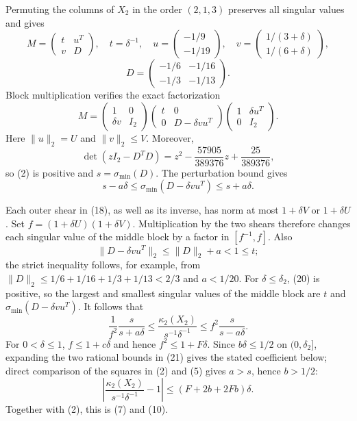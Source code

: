 \documentclass[11pt]{article}
\newcommand{\norm}[1]{\lVert#1\rVert_2}
\begin{document}
Permuting the columns of $X_2$ in the order $(2,1,3)$ preserves all singular
values and gives
\[
M=\begin{pmatrix}t&u^T\\v&D\end{pmatrix},\quad t=\delta^{-1},\quad
u=\begin{pmatrix}-1/9\\-1/19\end{pmatrix},\quad
v=\begin{pmatrix}1/(3+\delta)\\1/(6+\delta)\end{pmatrix},
\]
\[
D=\begin{pmatrix}-1/6&-1/16\\-1/3&-1/13\end{pmatrix}.
\tag{17}
\]
Block multiplication verifies the exact factorization
\[
M=
\begin{pmatrix}1&0\\\delta v&I_2\end{pmatrix}
\begin{pmatrix}t&0\\0&D-\delta vu^T\end{pmatrix}
\begin{pmatrix}1&\delta u^T\\0&I_2\end{pmatrix}.
\tag{18}
\]
Here $\norm{u}=U$ and $\norm{v}\leq V$.  Moreover,
\[
\det(zI_2-D^TD)=z^2-\frac{57905}{389376}z+
\frac{25}{389376},
\tag{19}
\]
so (2) is positive and $s=\sigma_{\min}(D)$.  The perturbation bound gives
\[
s-a\delta\leq\sigma_{\min}(D-\delta vu^T)
\leq s+a\delta.
\tag{20}
\]

Each outer shear in (18), as well as its inverse, has norm at most
$1+\delta V$ or $1+\delta U$.  Set
$f=(1+\delta U)(1+\delta V)$.  Multiplication by the two shears therefore
changes each singular value of the middle block by a factor in
$[f^{-1},f]$.  Also
\[
\norm{D-\delta vu^T}\leq\norm{D}+a<1\leq t;
\]
the strict inequality follows, for example, from
$\norm{D}\leq1/6+1/16+1/3+1/13<2/3$ and $a<1/20$.
For $\delta\leq\delta_2$, (20) is positive, so the largest and smallest
singular values of the middle block are $t$ and
$\sigma_{\min}(D-\delta vu^T)$.  It follows that
\[
\frac1{f^2}\frac{s}{s+a\delta}
\leq\frac{\kappa_2(X_2)}{s^{-1}\delta^{-1}}
\leq f^2\frac{s}{s-a\delta}.
\tag{21}
\]
For $0<\delta\leq1$,
$f\leq1+c\delta$ and hence $f^2\leq1+F\delta$.  Since
$b\delta\leq1/2$ on $(0,\delta_2]$, expanding the two rational bounds in
(21) gives the stated coefficient below; direct comparison of the squares in
(2) and (5) gives $a>s$, hence $b>1/2$:
\[
\left|\frac{\kappa_2(X_2)}{s^{-1}\delta^{-1}}-1\right|
\leq(F+2b+2Fb)\delta.
\]
Together with (2), this is (7) and (10).
\end{document}
